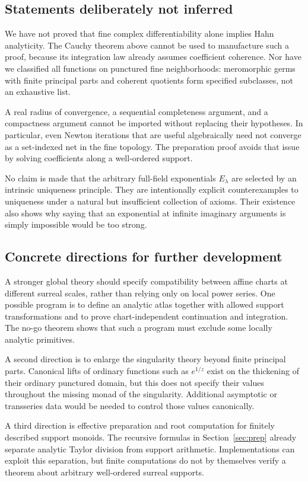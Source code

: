 \documentclass[11pt,a4paper]{article}
\numberwithin{equation}{section}
\theoremstyle{definition}
\theoremstyle{remark}
\begin{document}
\subsection{Statements deliberately not inferred}
We have not proved that fine complex differentiability alone implies Hahn analyticity. The Cauchy theorem above cannot be used to manufacture such a proof, because its integration law already assumes coefficient coherence. Nor have we classified all functions on punctured fine neighborhoods: meromorphic germs with finite principal parts and coherent quotients form specified subclasses, not an exhaustive list.

A real radius of convergence, a sequential completeness argument, and a compactness argument cannot be imported without replacing their hypotheses. In particular, even Newton iterations that are useful algebraically need not converge as a set-indexed net in the fine topology. The preparation proof avoids that issue by solving coefficients along a well-ordered support.

No claim is made that the arbitrary full-field exponentials $E_\lambda$ are selected by an intrinsic uniqueness principle. They are intentionally explicit counterexamples to uniqueness under a natural but insufficient collection of axioms. Their existence also shows why saying that an exponential at infinite imaginary arguments is simply impossible would be too strong.

\subsection{Concrete directions for further development}
A stronger global theory should specify compatibility between affine charts at different surreal scales, rather than relying only on local power series. One possible program is to define an analytic atlas together with allowed support transformations and to prove chart-independent continuation and integration. The no-go theorem shows that such a program must exclude some locally analytic primitives.

A second direction is to enlarge the singularity theory beyond finite principal parts. Canonical lifts of ordinary functions such as $e^{1/z}$ exist on the thickening of their ordinary punctured domain, but this does not specify their values throughout the missing monad of the singularity. Additional asymptotic or transseries data would be needed to control those values canonically.

A third direction is effective preparation and root computation for finitely described support monoids. The recursive formulas in Section~\ref{sec:prep} already separate analytic Taylor division from support arithmetic. Implementations can exploit this separation, but finite computations do not by themselves verify a theorem about arbitrary well-ordered surreal supports.
\end{document}
